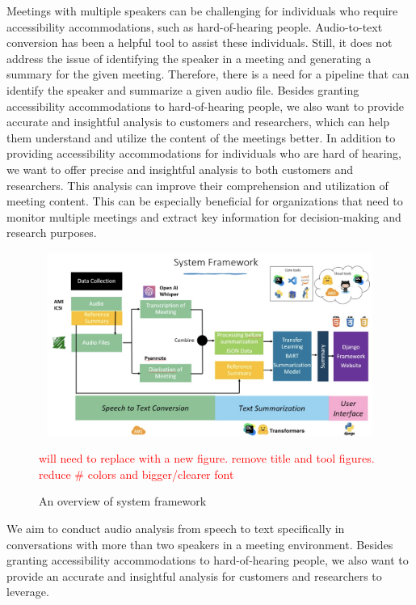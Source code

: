 Meetings with multiple speakers can be challenging for individuals who require accessibility accommodations, such as hard-of-hearing people. Audio-to-text conversion has been a helpful tool to assist these individuals. Still, it does not address the issue of identifying the speaker in a meeting and generating a summary for the given meeting. Therefore, there is a need for a pipeline that can identify the speaker and summarize a given audio file. Besides granting accessibility accommodations to hard-of-hearing people, we also want to provide accurate and insightful analysis to customers and researchers, which can help them understand and utilize the content of the meetings better. In addition to providing accessibility accommodations for individuals who are hard of hearing, we want to offer precise and insightful analysis to both customers and researchers. This analysis can improve their comprehension and utilization of meeting content. This can be especially beneficial for organizations that need to monitor multiple meetings and extract key information for decision-making and research purposes.



\begin{figure}[thbp]
	\centering
	\includegraphics[width=14cm, height=6cm]{figures/overview}
	\caption{An overview of system framework}
	\label{fig:overview}
	\textcolor{red}{will need to replace with a new figure. remove title and tool figures. reduce \# colors and bigger/clearer font}
\end{figure}




We aim to conduct audio analysis from speech to text specifically in conversations with more than two speakers in a meeting environment. Besides granting accessibility accommodations to hard-of-hearing people, we also want to provide an accurate and insightful analysis for customers and researchers to leverage.

